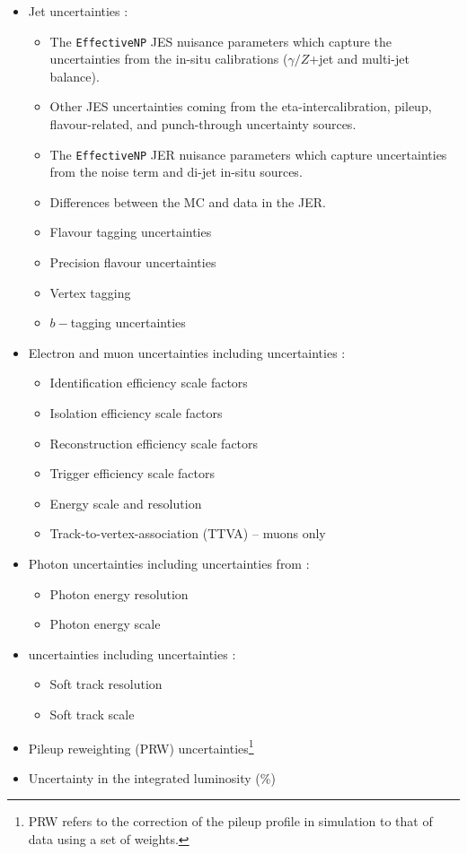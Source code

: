 \begin{itemize}
  \item Jet uncertainties \cite{Atlas:smallrcali}:
  \begin{itemize}
  \item The \verb+EffectiveNP+ JES nuisance parameters which capture the uncertainties from the in-situ calibrations ($\gamma/Z$+jet and multi-jet balance). 
  \item Other JES uncertainties coming from the eta-intercalibration, pileup, flavour-related, and punch-through uncertainty sources. 
  \item The \verb+EffectiveNP+ JER nuisance parameters which capture uncertainties from the noise term and di-jet in-situ sources.  
  \item Differences between the MC and data in the JER.
  \item Flavour tagging uncertainties
  \item Precision flavour uncertainties
  \item Vertex tagging
  \item $b-$tagging uncertainties
  \end{itemize} 
  \item Electron and muon uncertainties including uncertainties \cite{Atlas:egam_reco_gsf,Atlas:egam_reco,Atlas:muonreco}:
  \begin{itemize}
    \item Identification efficiency scale factors
    \item Isolation efficiency scale factors 
    \item Reconstruction efficiency scale factors
    \item Trigger efficiency scale factors
    \item Energy scale and resolution
    \item Track-to-vertex-association (TTVA) -- muons only
  \end{itemize}
  \item Photon uncertainties including uncertainties from \cite{Atlas:egam_reco_gsf,Atlas:egam_reco}:
  \begin{itemize}
    \item Photon energy resolution
    \item Photon energy scale
  \end{itemize}
  \item \met uncertainties including uncertainties \cite{Atlas:met}:
  \begin{itemize}
    \item Soft track resolution
    \item Soft track scale
  \end{itemize}
  \item Pileup reweighting (PRW) uncertainties\footnote{PRW refers to the correction of the pileup profile in simulation to that of data using a set of weights.}
  \item Uncertainty in the integrated luminosity (\%) \cite{LHC:atlaslumi}
\end{itemize}

